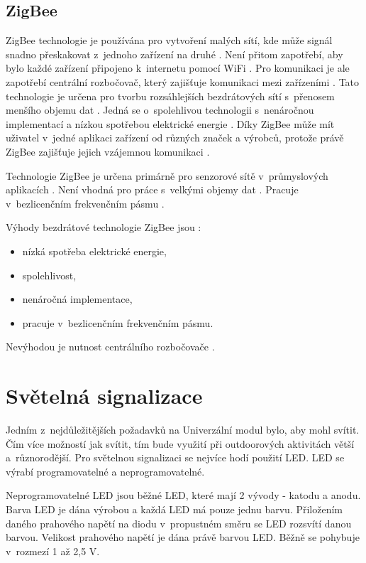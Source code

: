\subsection{ZigBee}
ZigBee technologie je používána pro vytvoření malých sítí, kde může signál snadno přeskakovat z~jednoho zařízení na druhé \cite{ZigBee_smart}.
Není přitom zapotřebí, aby bylo každé zařízení připojeno k~internetu pomocí WiFi \cite{ZigBee_smart}. Pro komunikaci je ale zapotřebí centrální 
rozbočovač, který zajišťuje komunikaci mezi zařízeními \cite{ZigBee_smart}. Tato technologie je určena pro tvorbu rozsáhlejších bezdrátových sítí
s~přenosem menšího objemu dat \cite{ZigBee_smart}. Jedná se o~spolehlivou technologii s~nenáročnou implementací a nízkou spotřebou elektrické energie 
\cite{ZigBee_smart}. Díky ZigBee může mít uživatel v~jedné aplikaci zařízení 
od různých značek a výrobců, protože právě ZigBee zajišťuje jejich vzájemnou komunikaci \cite{ZigBee_smart}.

Technologie ZigBee je určena primárně pro senzorové sítě v~průmyslových aplikacích \cite{Bezdrat_muni}. Není vhodná pro práce s~velkými objemy dat \cite{Bezdrat_muni}.
Pracuje v~bezlicenčním frekvenčním pásmu \cite{Bezdrat_muni}.

Výhody bezdrátové technologie ZigBee jsou \cite{ZigBee_smart}:
\begin{itemize}
  \item nízká spotřeba elektrické energie,
  \item spolehlivost, 
  \item nenáročná implementace,
  \item pracuje v~bezlicenčním frekvenčním pásmu. 
\end{itemize}

Nevýhodou je nutnost centrálního rozbočovače \cite{ZigBee_smart}.

\section{Světelná signalizace}
Jedním z~nejdůležitějších požadavků na Univerzální modul bylo, aby mohl svítit. Čím více možností jak svítit, tím bude využití při 
outdoorových aktivitách větší a~různorodější. Pro světelnou signalizaci se nejvíce hodí použití LED. LED se výrabí programovatelné a neprogramovatelné. 

Neprogramovatelné LED jsou běžné LED, které mají 2 vývody - katodu a anodu. Barva LED je dána výrobou a každá LED má pouze jednu 
barvu. Přiložením daného prahového napětí na diodu v~propustném směru se LED rozsvítí danou barvou. Velikost prahového napětí je dána
právě barvou LED. Běžně se pohybuje v~rozmezí 1 až 2,5 V.

